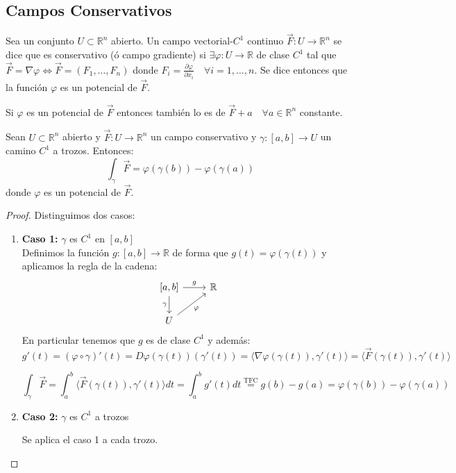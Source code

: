 \subsection{Campos Conservativos}

\begin{definición}
Sea un conjunto $U  \subset \mathbb{R}^n$ abierto. Un campo vectorial-$C^1$ continuo $\vec{F}: U \to \mathbb{R}^n$ se dice que es conservativo (ó campo gradiente) si $\exists \varphi: U \to \mathbb{R}$ de clase $C^1$ tal que $\vec{F} = \nabla \varphi \iff \vec{F} = (F_1, \ldots, F_n)$ donde $F_i = \frac{\partial \varphi}{\partial x_i} \quad \forall i = 1, \ldots, n$.
Se dice entonces que la función $\varphi$ es un potencial de $\vec{F}$.
\end{definición}

\begin{observación}
Si $\varphi$ es un potencial de $\vec{F}$ entonces también lo es de $\vec{F} + a \quad \forall a \in \mathbb{R}^n$ constante.
\end{observación}

\begin{proposición}
Sean $U \subset \mathbb{R}^n$ abierto y $\vec{F}: U \to \mathbb{R}^n$ un campo conservativo y $\gamma: [a,b] \to U$ un camino $C^1$ a trozos. Entonces:
$$\int_{\gamma} \vec{F} = \varphi(\gamma(b)) - \varphi(\gamma(a))$$
donde $\varphi$ es un potencial de $\vec{F}$.
\end{proposición}

\begin{proof}
    Distinguimos dos casos:
    \begin{enumerate}
        \item \textbf{Caso 1:} $\gamma$ es $C^1$ en $[a,b]$\\
              Definimos la función $g: [a,b] \to \mathbb{R}$ de forma que $g(t) = \varphi(\gamma(t))$ y aplicamos la regla de la cadena:
              \[
              \begin{tikzcd}
                {[a,b]} \arrow[d, "\gamma"'] \arrow[r, "g"] & \mathbb{R} \\
                U \arrow[ru, "\varphi"']
                \end{tikzcd}
                \]
                En particular tenemos que $g$ es de clase $C^1$ y además:
              \[
                 g'(t) = (\varphi \circ \gamma)'(t) = D\varphi (\gamma(t)) (\gamma'(t)) = \langle \nabla \varphi (\gamma(t)), \gamma'(t) \rangle = \langle \vec{F}(\gamma(t)), \gamma'(t) \rangle
              \]

              \[
                  \int_{\gamma} \vec{F} = \int_{a}^{b} \langle \vec{F} (\gamma(t)), \gamma'(t) \rangle dt = \int_{a}^{b} g'(t) dt \overset{\text{TFC}}{=} g(b) - g(a) = \varphi (\gamma(b)) - \varphi (\gamma(a))
              \]

        \item \textbf{Caso 2:} \(\gamma\) es \(C^1\) a trozos

              Se aplica el caso 1 a cada trozo.
    \end{enumerate}
\end{proof}

